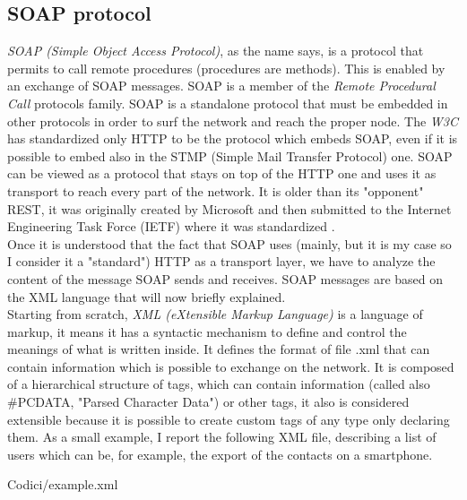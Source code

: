 \subsection{SOAP protocol} \label{soap}
\textit{SOAP (Simple Object Access Protocol)}, as the name says, is a protocol that permits to call remote procedures (procedures are methods). This is enabled by an exchange of SOAP messages. SOAP is a member of the \textit{Remote Procedural Call} protocols family. SOAP is a standalone protocol that must be embedded in other protocols in order to surf the network and reach the proper node. The \textit{W3C} has standardized only HTTP to be the protocol which embeds SOAP, even if it is possible to embed also in the STMP (Simple Mail Transfer Protocol) one. SOAP can be viewed as a protocol that stays on top of the HTTP one and uses it as transport to reach every part of the network. It is older than its "opponent" REST, it was originally created by Microsoft and then submitted to the Internet Engineering Task Force (IETF) where it was standardized \cite{soap}. \\
Once it is understood that the fact that SOAP uses (mainly, but it is my case so I consider it a "standard") HTTP as a transport layer, we have to analyze the content of the message SOAP sends and receives. SOAP messages are based on the XML language that will now briefly explained. \\
Starting from scratch, \textit{XML (eXtensible Markup Language)} is a  language of markup, it means it has a syntactic mechanism to define and control the meanings of what is written inside. It defines the format of file .xml that can contain information which is possible to exchange on the network. It is composed of a hierarchical structure of tags, which can contain information (called also \#PCDATA, "Parsed Character Data") or other tags, it also is considered extensible because it is possible to create custom tags of any type only declaring them. As a small example, I report the following XML file, describing a list of users which can be, for example, the export of the contacts on a smartphone. \\

\begin{lstinputlisting}[
		language=XML,
		morekeywords={ciao,users,user,name,surname,number,bye},
		caption={XML file example},
		label=lst:xml]
		{Codici/example.xml}
\end{lstinputlisting}

